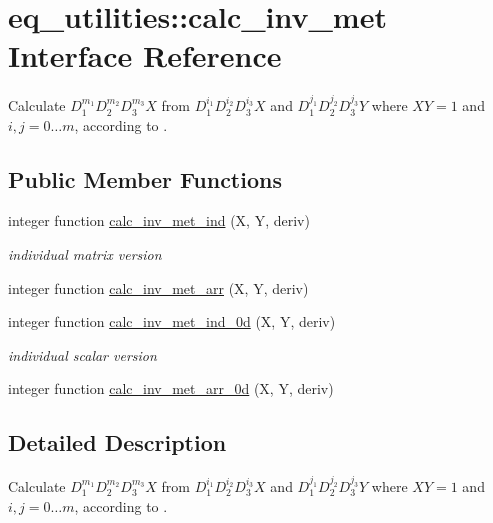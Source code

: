 \hypertarget{interfaceeq__utilities_1_1calc__inv__met}{}\section{eq\+\_\+utilities\+:\+:calc\+\_\+inv\+\_\+met Interface Reference}
\label{interfaceeq__utilities_1_1calc__inv__met}


Calculate $D_1^{m_1} D_2^{m_2} D_3^{m_3} X$ from $D_1^{i_1} D_2^{i_2} D_3^{i_3} X$ and $D_1^{j_1} D_2^{j_2} D_3^{j_3} Y$ where $XY=1$ and $i,j = 0\ldots m$, according to \cite{Weyens3D}.  


\subsection*{Public Member Functions}
\begin{DoxyCompactItemize}
\item 
integer function \hyperlink{interfaceeq__utilities_1_1calc__inv__met_a52032d5ed98c02aa25ec4ee8489d3452}{calc\+\_\+inv\+\_\+met\+\_\+ind} (X, Y, deriv)
\begin{DoxyCompactList}\small\item\em individual matrix version \end{DoxyCompactList}\item 
integer function \hyperlink{interfaceeq__utilities_1_1calc__inv__met_a82b49d5a135cc6bdd47fd3e95af3ed38}{calc\+\_\+inv\+\_\+met\+\_\+arr} (X, Y, deriv)
\item 
integer function \hyperlink{interfaceeq__utilities_1_1calc__inv__met_a6d60c210f6a6db200d329b2c5748ef9b}{calc\+\_\+inv\+\_\+met\+\_\+ind\+\_\+0d} (X, Y, deriv)
\begin{DoxyCompactList}\small\item\em individual scalar version \end{DoxyCompactList}\item 
integer function \hyperlink{interfaceeq__utilities_1_1calc__inv__met_aea4faf0a5944ca034e7db4b0c2f26043}{calc\+\_\+inv\+\_\+met\+\_\+arr\+\_\+0d} (X, Y, deriv)
\end{DoxyCompactItemize}


\subsection{Detailed Description}
Calculate $D_1^{m_1} D_2^{m_2} D_3^{m_3} X$ from $D_1^{i_1} D_2^{i_2} D_3^{i_3} X$ and $D_1^{j_1} D_2^{j_2} D_3^{j_3} Y$ where $XY=1$ and $i,j = 0\ldots m$, according to \cite{Weyens3D}. 

